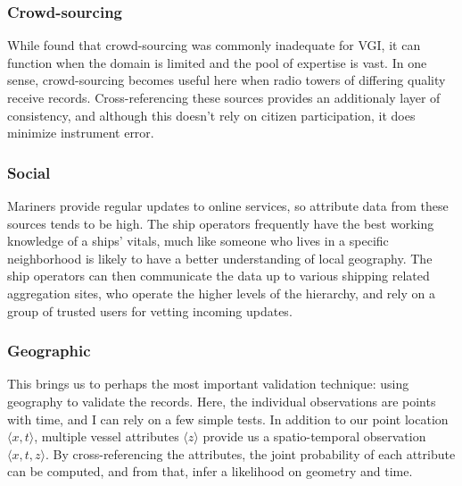 \documentclass[12pt,letterpaper]{article}
\begin{document}
\subsubsection{Crowd-sourcing}
While \cite{goodchildli2012} found that crowd-sourcing was commonly inadequate for VGI, it can function when the domain is limited and the pool of expertise is vast. In one sense, crowd-sourcing becomes useful here when radio towers of differing quality receive records. Cross-referencing these sources provides an additionaly layer of consistency, and although this doesn't rely on citizen participation, it does minimize instrument error.

\subsubsection{Social}
Mariners provide regular updates to online services, so attribute data from these sources tends to be high. The ship operators frequently have the best working knowledge of a ships' vitals, much like someone who lives in a specific neighborhood is likely to have a better understanding of local geography. The ship operators can then communicate the data up to various shipping related aggregation sites, who operate the higher levels of the hierarchy, and rely on a group of trusted users for vetting incoming updates.

\subsubsection{Geographic}
This brings us to perhaps the most important validation technique: using geography to validate the records. Here, the individual observations are points with time, and I can rely on a few simple tests.  In addition to our point location $\langle x,t \rangle$, multiple vessel attributes $\langle z \rangle$ provide us a spatio-temporal observation $\langle x,t,z \rangle$. %
 By cross-referencing the attributes, the joint probability of each attribute can be computed, and from that, infer a likelihood on geometry and time. %
\end{document}
